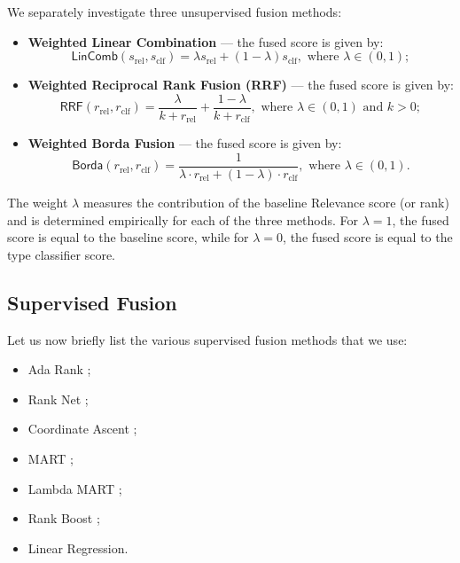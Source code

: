 We separately investigate three unsupervised fusion methods:
\begin{itemize}

 \item \textbf{Weighted Linear Combination} --- the fused score is given by:
 \begin{equation} \label{interp-formula}
 \textsf{LinComb}(s_{\text{rel}}, s_{\text{clf}}) =
	      \lambda s_{\text{rel}} + (1-\lambda) s_{\text{clf}}, \text{ where } \lambda \in (0,1);
 \end{equation}

\item \textbf{Weighted Reciprocal Rank Fusion (RRF)} \cite{rrf} --- the fused score is given by:
 \begin{equation}\label{rrf-formula}
  \textsf{RRF}(r_{\text{rel}}, r_{\text{clf}}) =
	      \displaystyle\frac{\lambda}{k + r_{\text{rel}}} + \displaystyle\frac{1- \lambda}{k + r_{\text{clf}}},  \text{ where } \lambda \in (0,1)
  \text{ and } k>0;
 \end{equation}

 \item \textbf{Weighted Borda Fusion} \cite{borda} ---  the fused score is given by:
 \begin{equation}\label{borda-formula}
   \textsf{Borda}(r_{\text{rel}}, r_{\text{clf}}) =
	    \displaystyle\frac{1}{\lambda \cdot r_{\text{rel}} + (1-\lambda)\cdot r_{\text{clf}}},  \text{ where } \lambda \in (0,1).
 \end{equation}
  \end{itemize}

The weight $\lambda$ measures the contribution of the baseline \textsf{Relevance} score (or rank) and
is determined empirically for each of the three methods. For $\lambda=1$, the fused score is equal to the baseline score,
while for $\lambda=0$, the fused score is equal to the type classifier score.

\subsection{Supervised Fusion}\label{sup-fusion}
Let us now briefly list the various supervised fusion methods that we use:
\begin{itemize}
 \item {Ada Rank} \cite{adaRank};
 \item {Rank Net} \cite{rankNet};
 \item {Coordinate Ascent} \cite{coordAscent};
 \item {MART} \cite{mart};
 \item {Lambda MART} \cite{lambda-mart};
 \item {Rank Boost} \cite{rankBoost};
  \item {Linear Regression}.
\end{itemize}

